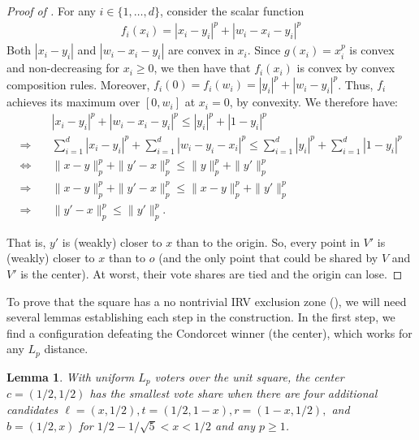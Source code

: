 \documentclass{article}
\theoremstyle{theorem}
\newtheorem{lemma}{Lemma}
\theoremstyle{definition}
\begin{document}
\begin{proof}[Proof of ]
For any $i \in \{1, \dots, d\}$, consider the scalar function 
\begin{align*}
  f_i(x_i) = |x_i - y_i|^p + |w_i- x_i - y_i|^p 
\end{align*}
Both $|x_i - y_i|$ and $|w_i- x_i - y_i|$ are convex in $x_i$. Since $g(x_i) = x_i^p$ is convex and non-decreasing for $x_i \ge 0$, we then have that $f_i(x_i)$ is convex by convex composition rules. Moreover, $f_i(0) = f_i(w_i) = |y_i|^p + |w_i-y_i|^p$. Thus, $f_i$ achieves its maximum over $[0, w_i]$ at $x_i = 0$, by convexity. We therefore have:
\begin{align*}
&|x_i - y_i|^p + |w_i- x_i - y_i|^p  \le |y_i|^p + |1-y_i|^p \tag{$\forall i = 1, \dots, d$}\\
\Rightarrow \quad & \sum_{i = 1}^d |x_i - y_i|^p + \sum_{i = 1}^d|w_i- y_i - x_i |^p \le \sum_{i = 1}^d |y_i|^p + \sum_{i = 1}^d|1-y_i|^p \\
\Leftrightarrow \quad &  \|x - y\|_p^p + \|y'- x\|_p^p \le \|y\|_p^p + \|y'\|_p^p \\
   \Rightarrow \quad &  \|x - y\|_p^p + \|y'- x\|_p^p \le \|x - y\|_p^p + \|y'\|_p^p \tag{since $\|y\|_p \le \|x - y\|_p$}\\
   \Rightarrow \quad & \|y' - x\|_p^p \le \|y'\|_p^p. 
\end{align*}

That is, $y'$ is (weakly) closer to $x$ than to the origin. So, every point in $V'$ is (weakly) closer to $x$ than to $o$ (and the only point that could be shared by $V$ and $V'$ is the center). At worst, their vote shares are tied and the origin can lose. 
\end{proof}

To prove that the square has a no nontrivial IRV exclusion zone (), we will need several lemmas establishing each step in the construction. In the first step, we find a configuration defeating the Condorcet winner (the center), which works for any $L_p$ distance.


\begin{lemma}\label{lemma:square-step1}
  With uniform $L_p$ voters over the unit square, the center $c = (1/2, 1/2)$ has the smallest vote share when there are four additional candidates $\ell = (x, 1/2), t = (1/2, 1-x), r = (1-x, 1/2),$ and $b = (1/2, x)$ for $1/2 - 1/\sqrt{5} < x < 1/2$ and any $p \ge 1$.
\end{lemma}
\end{document}
